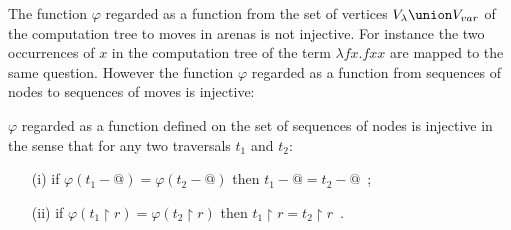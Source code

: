 The function $\varphi$ regarded as a function from the set of vertices $V_\lambda \union V_{var}$ of the computation tree to moves in arenas is not injective.
For instance the two occurrences of $x$ in the computation tree of the term $\lambda f x. f x x$ are mapped to the same question. However
the function $\varphi$ regarded as a function from sequences of nodes to sequences of moves is injective:
\begin{lemma}
\label{lem:varphiinjective}
$\varphi$ regarded as a function defined on the set of
sequences of nodes is injective in the sense that for any two traversals $t_1$ and $t_2$:
\begin{itemize}
\item[(i)] if $\varphi (t_1 - @ ) = \varphi (t_2 - @ )$ then $t_1-@ =t_2 -@$\ ;
\item[(ii)] if $\varphi (t_1 \upharpoonright r ) = \varphi (t_2 \upharpoonright r )$ then $t_1\upharpoonright r = t_2\upharpoonright r$\ .
\end{itemize}
\end{lemma}
